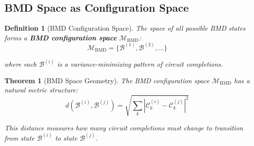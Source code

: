 \documentclass[12pt,a4paper]{article}
\newtheorem{theorem}{Theorem}
\newtheorem{definition}{Definition}
\begin{document}
\subsection{BMD Space as Configuration Space}

\begin{definition}[BMD Configuration Space]
\label{def:bmd_space}
The space of all possible BMD states forms a \textbf{BMD configuration space} $\mathcal{M}_{\text{BMD}}$:
\begin{equation}
\mathcal{M}_{\text{BMD}} = \{\mathcal{B}^{(1)}, \mathcal{B}^{(2)}, \ldots\}
\end{equation}

where each $\mathcal{B}^{(i)}$ is a variance-minimizing pattern of circuit completions.
\end{definition}

\begin{theorem}[BMD Space Geometry]
\label{thm:bmd_geometry}
The BMD configuration space $\mathcal{M}_{\text{BMD}}$ has a natural metric structure:
\begin{equation}
d(\mathcal{B}^{(i)}, \mathcal{B}^{(j)}) = \sqrt{\sum_{k} |\mathcal{C}_k^{(i)} - \mathcal{C}_k^{(j)}|^2}
\end{equation}

This distance measures how many circuit completions must change to transition from state $\mathcal{B}^{(i)}$ to state $\mathcal{B}^{(j)}$.
\end{theorem}
\end{document}
